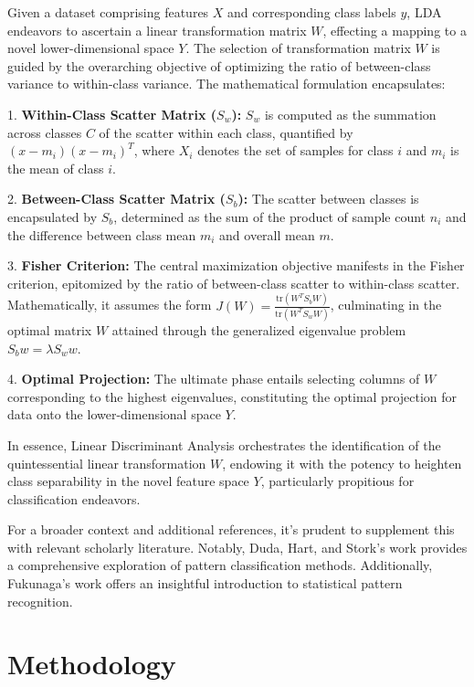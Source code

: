 \documentclass[8pt,a4paper,oneside]{elsarticle}
\begin{document}
Given a dataset comprising features $X$ and corresponding class labels $y$, LDA endeavors to ascertain a linear transformation matrix $W$, effecting a mapping to a novel lower-dimensional space $Y$. The selection of transformation matrix $W$ is guided by the overarching objective of optimizing the ratio of between-class variance to within-class variance. The mathematical formulation encapsulates:

1. \textbf{Within-Class Scatter Matrix ($S_w$):}
   $S_w$ is computed as the summation across classes $C$ of the scatter within each class, quantified by $(x - m_i)(x - m_i)^T$, where $X_i$ denotes the set of samples for class $i$ and $m_i$ is the mean of class $i$.

2. \textbf{Between-Class Scatter Matrix ($S_b$):}
   The scatter between classes is encapsulated by $S_b$, determined as the sum of the product of sample count $n_i$ and the difference between class mean $m_i$ and overall mean $m$.

3. \textbf{Fisher Criterion:}
   The central maximization objective manifests in the Fisher criterion, epitomized by the ratio of between-class scatter to within-class scatter. Mathematically, it assumes the form $J(W) = \frac{\text{tr}(W^T S_b W)}{\text{tr}(W^T S_w W)}$, culminating in the optimal matrix $W$ attained through the generalized eigenvalue problem $S_b w = \lambda S_w w$.

4. \textbf{Optimal Projection:}
   The ultimate phase entails selecting columns of $W$ corresponding to the highest eigenvalues, constituting the optimal projection for data onto the lower-dimensional space $Y$.

In essence, Linear Discriminant Analysis orchestrates the identification of the quintessential linear transformation $W$, endowing it with the potency to heighten class separability in the novel feature space $Y$, particularly propitious for classification endeavors.

For a broader context and additional references, it's prudent to supplement this with relevant scholarly literature. Notably, Duda, Hart, and Stork's work \cite{duda2000pattern_disc_duda_38} provides a comprehensive exploration of pattern classification methods. Additionally, Fukunaga's work \cite{10.1016/c2009-0-27872-x_discrim_36} offers an insightful introduction to statistical pattern recognition.

\section{Methodology} \label{Methodology}
\end{document}
